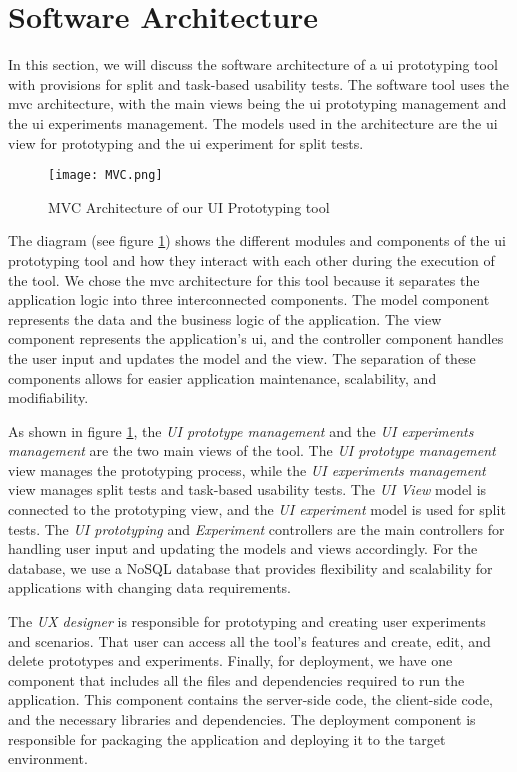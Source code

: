 \section{Software Architecture}
\label{sc:section:architecture}
In this section, we will discuss the software architecture of a \ac{ui} prototyping tool with provisions for split and task-based usability tests. 
The software tool uses the \ac{mvc} architecture, with the main views being the \ac{ui} prototyping management and the \ac{ui} experiments management. 
The models used in the architecture are the \ac{ui} view for prototyping and the \ac{ui} experiment for split tests. 
\begin{figure}[htbp!]
    \centering    
    \texttt{[image: MVC.png]} 
    \caption[MVC Architecture of the System]{MVC Architecture of our UI Prototyping tool}
    \label{fig:sc:componentD}
\end{figure}
The diagram (see figure \ref{fig:sc:componentD}) shows the different modules and components of the \ac{ui} prototyping tool and how they interact with each other during the execution of the tool.
We chose the \ac{mvc} architecture for this tool because it separates the application logic into three interconnected components. 
The model component represents the data and the business logic of the application. 
The view component represents the application's \ac{ui}, and the controller component handles the user input and updates the model and the view. 
The separation of these components allows for easier application maintenance, scalability, and modifiability.

As shown in figure \ref{fig:sc:componentD}, the \textit{UI prototype management} and the \textit{UI experiments management} are the two main views of the tool.
The \textit{UI prototype management} view manages the prototyping process, while the \textit{UI experiments management} view manages split tests and task-based usability tests. 
The \textit{UI View} model is connected to the prototyping view, and the \textit{UI experiment} model is used for split tests. 
The \textit{UI prototyping} and \textit{Experiment} controllers are the main controllers for handling user input and updating the models and views accordingly.
For the database, we use a NoSQL database that provides flexibility and scalability for applications with changing data requirements. 

The \textit{UX designer} is responsible for prototyping and creating user experiments and scenarios. 
That user can access all the tool's features and create, edit, and delete prototypes and experiments.
Finally, for deployment, we have one component that includes all the files and dependencies required to run the application. 
This component contains the server-side code, the client-side code, and the necessary libraries and dependencies. 
The deployment component is responsible for packaging the application and deploying it to the target environment.

